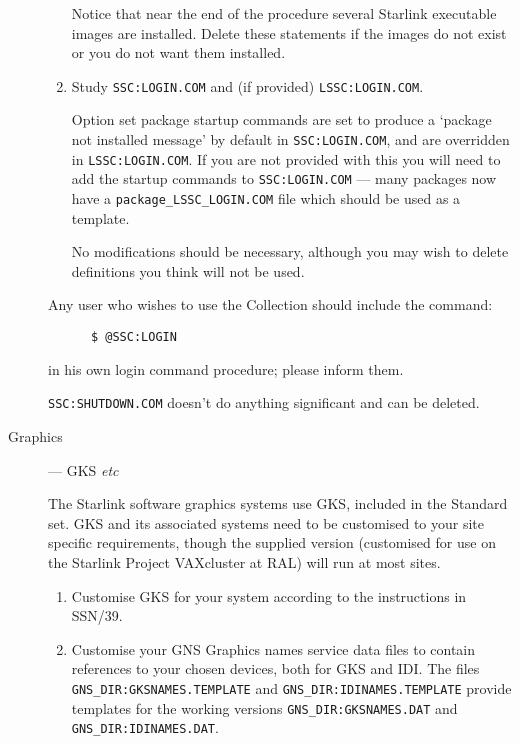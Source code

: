 \begin{description}
\begin{enumerate}
Notice that near the end of the procedure several Starlink executable images
are installed. Delete these statements if the images do not exist or you do not
want them installed.

\item Study {\tt SSC:\-LOGIN.\-COM} and (if provided) {\tt LSSC:\-LOGIN.\-COM}.

Option set package startup commands are set to produce a `package not installed
message' by default in {\tt SSC:LOGIN.COM}, and are overridden in
{\tt LSSC:LOGIN.COM}. If you are not provided with this you will need to add
the startup commands to  {\tt SSC:LOGIN.COM} --- many packages now have
a {\tt package\_LSSC\-\_LOGIN.COM} file which should be used as a template.

No modifications should be necessary, although you may wish to delete
definitions you think will not be used.

\end{enumerate}

Any user who wishes to use the Collection should include the command:
\begin{verbatim}
      $ @SSC:LOGIN
\end{verbatim}
in his own login command procedure; please inform them.

{\tt SSC:SHUTDOWN.COM} doesn't do anything significant and can be deleted.

\item [Graphics] --- GKS {\em etc}

The Starlink software graphics systems use GKS, included in the Standard set.
GKS and its associated systems need to be customised to your site specific
requirements, though the supplied version (customised for use on the Starlink
Project VAXcluster at RAL) will run at most sites.

\begin{enumerate} \item Customise GKS for your system according to the
instructions in SSN/39. \item Customise your GNS Graphics names service data
files to contain references to your chosen devices, both for GKS and IDI. The
files  {\tt GNS\_DIR:GKSNAMES.TEMPLATE} and {\tt GNS\_DIR:IDINAMES.TEMPLATE}
provide templates for the working versions {\tt GNS\_DIR:\-GKSNAMES.\-DAT} and
{\tt GNS\_DIR:\-IDINAMES.DAT}.

\end{enumerate}

\end{description}

